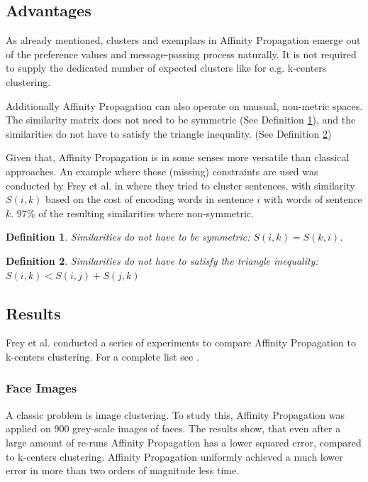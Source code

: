 \documentclass[11pt,a4paper]{article}
\newtheorem{definition}{Definition}
\begin{document}
\subsection{Advantages}
As already mentioned, clusters and exemplars in Affinity Propagation emerge out of the preference values and message-passing process naturally. It is not required to supply the dedicated number of expected clusters like for e.g. k-centers clustering. \cite{frey2007clustering}

Additionally Affinity Propagation can also operate on unusual, non-metric spaces. The similarity matrix does not need to be symmetric (See Definition \ref{def:symmetric}), and the similarities do not have to satisfy the triangle inequality. (See Definition \ref{def:triangleieq}) \cite{frey2007clustering}

Given that, Affinity Propagation is in some senses more versatile than classical approaches. An example where those (missing) constraints are used was conducted by Frey et al. in \cite{frey2007clustering} where they tried to cluster sentences, with similarity $S(i,k)$ based on the cost of encoding words in sentence $i$ with words of sentence $k$. 97\% of the resulting similarities where non-symmetric. \cite{frey2007clustering} 
\begin{definition}\label{def:symmetric}
	Similarities do not have to be symmetric: $S(i,k) = S(k,i)$.
\end{definition}
\begin{definition}\label{def:triangleieq}
	Similarities do not have to satisfy the triangle inequality: $S(i,k) < S(i,j) + S(j,k)$
\end{definition}
\subsection{Results}
Frey et al. conducted a series of experiments to compare Affinity Propagation to k-centers clustering. For a complete list see \cite{frey2007clustering}.
\subsubsection{Face Images}
A classic problem is image clustering. To study this, Affinity Propagation was applied on 900 grey-scale images of faces. The results show, that even after a large amount of re-runs Affinity Propagation has a lower squared error, compared to k-centers clustering. Affinity Propagation uniformly achieved a much lower error in more than two orders of magnitude less time. \cite{frey2007clustering}
\end{document}
